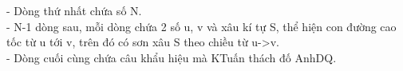 - Dòng thứ nhất chứa số N.   
\\   - N-1 dòng sau, mỗi dòng chứa 2 số u, v và xâu kí tự S, thể hiện con đường cao tốc từ u tới v, trên đó có sơn xâu S theo chiều từ u->v.   
\\   - Dòng cuối cùng chứa câu khẩu hiệu mà KTuấn thách đố AnhDQ.